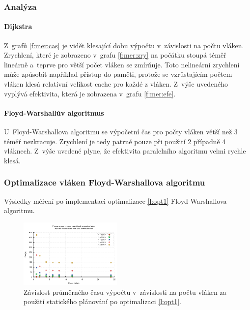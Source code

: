 \subsubsection{Analýza}
\paragraph{Dijkstra}
Z~grafů \ref{f:mer:cas} je vidět klesající dobu výpočtu v~závislosti na počtu vláken.
Zrychlení, které je zobrazeno v~grafu \ref{f:mer:zry} na počátku stoupá téměř lineárně a~teprve pro větší počet vláken 
se zmírňuje. Toto nelineární zrychlení může způsobit například přístup do paměti, protože se vzrůstajícím počtem vláken klesá 
relativní velikost cache pro každé z vláken.
Z~výše uvedeného vyplývá efektivita, která je zobrazena v~grafu \ref{f:mer:efe}.

\paragraph{Floyd-Warshallův algoritmus}
U~Floyd-Warshallova algoritmu se výpočetní čas pro počty vláken větší než 3 téměř nezkracuje. 
Zrychlení je tedy patrné pouze při použití 2 případně 4 vláknech. Z~výše uvedené plyne, že efektivita paralelního algoritmu velmi rychle klesá.

\subsubsection{Optimalizace vláken Floyd-Warshallova algoritmu} \label{l:mer:opt1}
Výsledky měření po implementaci optimalizace \ref{l:opt1} Floyd-Warshallova algoritmu.

\begin{figure}
    \centering
    \includegraphics[width=0.45\textwidth]{../grafy/02_openMP/02-01-Floyd_cas_v2}
    \caption{Závislost průměrného času výpočtu v~závislosti na počtu vláken za použití statického plánování po optimalizaci \ref{l:opt1}.}
    \label{f:mer:cas:opt1}
\end{figure}

